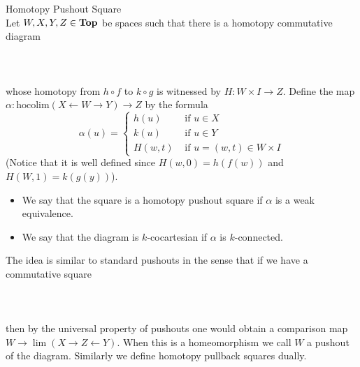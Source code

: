 \documentclass[a4paper]{article}
\begin{document}
\begin{defn}{Homotopy Pushout Square}{}\\
Let $W,X,Y,Z\in\bold{Top}$ be spaces such that there is a homotopy commutative diagram  
 \\~\\  \\~\\
whose homotopy from $h\circ f$ to $k\circ g$ is witnessed by $H:W\times I\to Z$. Define the map $\alpha:\text{hocolim}(X\leftarrow W\rightarrow Y)\to Z$ by the formula $$\alpha(u)=\begin{cases}
h(u) & \text{ if }u\in X\\
k(u) & \text{ if }u\in Y\\
H(w,t) & \text{ if }u=(w,t)\in W\times I
\end{cases}$$ (Notice that it is well defined since $H(w,0)=h(f(w))$ and $H(W,1)=k(g(y))$). 
\begin{itemize}
\item We say that the square is a homotopy pushout square if $\alpha$ is a weak equivalence. 
\item We say that the diagram is $k$-cocartesian if $\alpha$ is $k$-connected. 
\end{itemize}
\end{defn}

The idea is similar to standard pushouts in the sense that if we have a commutative square  
 \\~\\  \\~\\
then by the universal property of pushouts one would obtain a comparison map $W\to\lim(X\rightarrow Z\leftarrow Y)$. When this is a homeomorphism we call $W$ a pushout of the diagram. Similarly we define homotopy pullback squares dually. 
\end{document}
